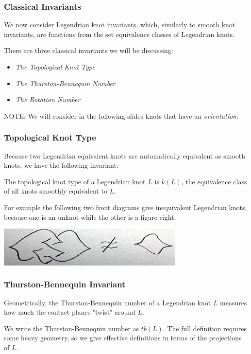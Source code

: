 \documentclass{beamer}
\begin{document}
\begin{frame}
    \frametitle{Classical Invariants}
    We now consider \alert{Legendrian knot invariants}, which, similarly to smooth
    knot invariants, are functions from the set equivalence classes of Legendrian
    knots.

    There are three classical invariants we will be discussing:
    \begin{itemize}
        \item \textit{The Topological Knot Type}
        \item \textit{The Thurston-Bennequin Number}
        \item \textit{The Rotation Number}
    \end{itemize}
    \alert{NOTE}: We will consider in the following slides knots
    that have an \textit{orientation}.
\end{frame}

\begin{frame}
    \frametitle{Topological Knot Type}
    Because two Legendrian equivalent knots are automatically equivalent
    as smooth knots, we have the following invariant:
    \begin{definition}
        The \alert{topological knot type} of a Legendrian knot $L$ is $k(L)$,
        the equivalence class of all knots smoothly equivalent to $L$.
    \end{definition}
    For example the following two front diagrams give inequivalent Legendrian knots,
    because one is an unknot while the other is a figure-eight.

    \includegraphics[height=2cm]{notEq.jpg}
\end{frame}

\begin{frame}
    \frametitle{Thurston-Bennequin Invariant}
    Geometrically, the \alert{Thurston-Bennequin number} of a Legendrian knot $L$
    measures how much the contact planes "twist" around $L$.

    We write the Thurston-Bennequin number as \alert{$tb(L)$}.
    The full definition requires some heavy geometry, so we give
    effective definitions in terms of the projections of $L$.
\end{frame}
\end{document}
